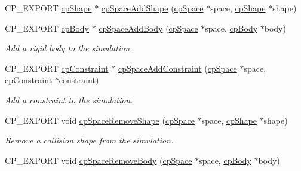 \begin{DoxyCompactItemize}
C\+P\+\_\+\+E\+X\+P\+O\+RT \mbox{\hyperlink{structcp_shape}{cp\+Shape}} $\ast$ \mbox{\hyperlink{group__cp_space_ga8f730ea78b5c62c0aa3b05ff4ef1e5e9}{cp\+Space\+Add\+Shape}} (\mbox{\hyperlink{structcp_space}{cp\+Space}} $\ast$space, \mbox{\hyperlink{structcp_shape}{cp\+Shape}} $\ast$shape)
\item 
\mbox{\label{group__cp_space_ga7485f8acdcafd6802e99417f0d427668}} 
C\+P\+\_\+\+E\+X\+P\+O\+RT \mbox{\hyperlink{structcp_body}{cp\+Body}} $\ast$ \mbox{\hyperlink{group__cp_space_ga7485f8acdcafd6802e99417f0d427668}{cp\+Space\+Add\+Body}} (\mbox{\hyperlink{structcp_space}{cp\+Space}} $\ast$space, \mbox{\hyperlink{structcp_body}{cp\+Body}} $\ast$body)
\begin{DoxyCompactList}\small\item\em Add a rigid body to the simulation. \end{DoxyCompactList}\item 
\mbox{\label{group__cp_space_gac973a08fdbedd42e769a338f97d8ffd5}} 
C\+P\+\_\+\+E\+X\+P\+O\+RT \mbox{\hyperlink{structcp_constraint}{cp\+Constraint}} $\ast$ \mbox{\hyperlink{group__cp_space_gac973a08fdbedd42e769a338f97d8ffd5}{cp\+Space\+Add\+Constraint}} (\mbox{\hyperlink{structcp_space}{cp\+Space}} $\ast$space, \mbox{\hyperlink{structcp_constraint}{cp\+Constraint}} $\ast$constraint)
\begin{DoxyCompactList}\small\item\em Add a constraint to the simulation. \end{DoxyCompactList}\item 
\mbox{\label{group__cp_space_gadd58c37e69a7575b829e25ed3c427fc8}} 
C\+P\+\_\+\+E\+X\+P\+O\+RT void \mbox{\hyperlink{group__cp_space_gadd58c37e69a7575b829e25ed3c427fc8}{cp\+Space\+Remove\+Shape}} (\mbox{\hyperlink{structcp_space}{cp\+Space}} $\ast$space, \mbox{\hyperlink{structcp_shape}{cp\+Shape}} $\ast$shape)
\begin{DoxyCompactList}\small\item\em Remove a collision shape from the simulation. \end{DoxyCompactList}\item 
\mbox{\label{group__cp_space_ga3375e5b056a887baaedd75fa1403d1cf}} 
C\+P\+\_\+\+E\+X\+P\+O\+RT void \mbox{\hyperlink{group__cp_space_ga3375e5b056a887baaedd75fa1403d1cf}{cp\+Space\+Remove\+Body}} (\mbox{\hyperlink{structcp_space}{cp\+Space}} $\ast$space, \mbox{\hyperlink{structcp_body}{cp\+Body}} $\ast$body)

\end{DoxyCompactItemize}
